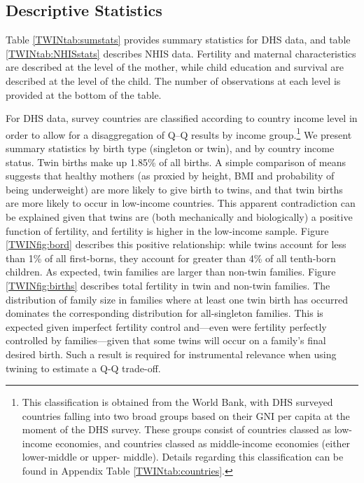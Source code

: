 \documentclass[subeqn]{article}
\begin{document}
\begin{spacing}{1.4}
\subsection{Descriptive Statistics}                \label{TWINsscn:descriptives}
Table \ref{TWINtab:sumstats} provides summary statistics for DHS data, and table
\ref{TWINtab:NHISstats} describes NHIS data.  Fertility and maternal 
characteristics are described at the level of the mother, while child education 
and survival are described at the level of the child. The number of observations 
at each level is provided at the bottom of the table.

For DHS data, survey countries are classified according to country income level 
in order to allow for a disaggregation of Q--Q results by income group.\footnote{
This classification is obtained from the World Bank, with DHS surveyed countries 
falling into two broad groups based on their GNI per capita at the moment of the 
DHS survey. These groups consist of countries classed as low-income economies, 
and countries classed as middle-income economies (either lower-middle or upper-%
middle). Details regarding this classification can be found in Appendix Table 
\ref{TWINtab:countries}.} We present summary statistics by birth type (singleton 
or twin), and by country income status. Twin births make up 1.85\% of all births.
A simple comparison of means suggests that healthy mothers (as proxied by height, 
BMI and probability of being underweight) are more likely to give birth to twins, 
and that twin births are more likely to occur in low-income countries. This 
apparent contradiction can be explained given that twins are (both mechanically 
and biologically) a positive function of fertility, and fertility is higher in 
the low-income sample. Figure \ref{TWINfig:bord} describes this positive 
relationship: while twins account for less than 1\% of all first-borns, they 
account for greater than 4\% of all tenth-born children. As expected, twin 
families are larger than non-twin families. Figure \ref{TWINfig:births} 
describes total fertility in twin and non-twin families. The distribution of 
family size in families where at least one twin birth has occurred dominates the 
corresponding distribution for all-singleton families.  This is expected given 
imperfect fertility control and---even were fertility perfectly controlled by 
families---given that some twins will occur on a family's final desired birth. 
Such a result is required for instrumental relevance when using twining to 
estimate a Q-Q trade-off.


\end{spacing}
\end{document}
